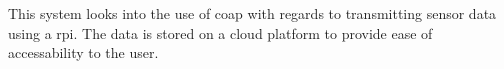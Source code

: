 This system looks into the use of \gls{coap} with regards to transmitting sensor data using a \gls{rpi}.
The data is stored on a cloud platform to provide ease of accessability to the user.